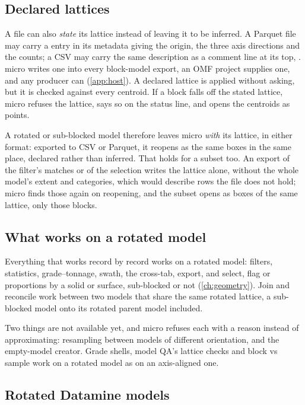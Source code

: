 \subsection{Declared lattices}

A file can also \emph{state} its lattice instead of leaving it to be inferred. A Parquet file may carry a  entry in its metadata giving the origin, the three axis directions and the counts; a CSV may carry the same description as a comment line at its top, . micro writes one into every block-model export, an OMF project supplies one, and any producer can (\cref{app:host}). A declared lattice is applied without asking, but it is checked against every centroid. If a block falls off the stated lattice, micro refuses the lattice, says so on the status line, and opens the centroids as points.

A rotated or sub-blocked model therefore leaves micro \emph{with} its lattice, in either format: exported to CSV or Parquet, it reopens as the same boxes in the same place, declared rather than inferred. That holds for a subset too. An export of the filter's matches or of the selection writes the lattice alone, without the whole model's extent and categories, which would describe rows the file does not hold; micro finds those again on reopening, and the subset opens as boxes of the same lattice, only those blocks.

\subsection{What works on a rotated model}

Everything that works record by record works on a rotated model: filters, statistics, grade–tonnage, swath, the cross-tab, export, and select, flag or proportions by a solid or surface, sub-blocked or not (\cref{ch:geometry}). Join and reconcile work between two models that share the same rotated lattice, a sub-blocked model onto its rotated parent model included.

Two things are not available yet, and micro refuses each with a reason instead of approximating: resampling between models of different orientation, and the empty-model creator. Grade shells, model QA's lattice checks and block vs sample work on a rotated model as on an axis-aligned one.

\subsection{Rotated Datamine models}\label{sec:blocks-dm-rotated}

